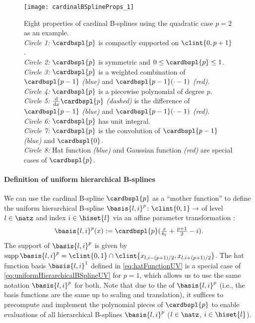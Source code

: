 \begin{figure}
  \texttt{[image: cardinalBSplineProps\_1]}%
  \caption{%
    Eight properties of cardinal B-splines using the quadratic case
    $p = 2$ as an example.\\
    \emph{Circle 1:} $\cardbspl{p}$ is compactly supported on $\clint{0, p+1}$.\\
    \emph{Circle 2:} $\cardbspl{p}$ is symmetric and $0 \le \cardbspl{p} \le 1$.\\
    \emph{Circle 3:} $\cardbspl{p}$ is a weighted combination of
    $\cardbspl{p-1}$ \emph{\textcolor{C0}{(blue)}} and
    $\cardbspl{p-1}({\cdot} - 1)$ \emph{\textcolor{C1}{(red)}}.\\
    \emph{Circle 4:} $\cardbspl{p}$ is a piecewise polynomial of degree $p$.\\
    \emph{Circle 5:} $\frac{\diff}{\dx} \cardbspl{p}$ \emph{(dashed)}
    is the difference of
    $\cardbspl{p-1}$ \emph{\textcolor{C0}{(blue)}} and
    $\cardbspl{p-1}({\cdot} - 1)$ \emph{\textcolor{C1}{(red)}}.\\
    \emph{Circle 6:} $\cardbspl{p}$ has unit integral.\\
    \emph{Circle 7:} $\cardbspl{p}$ is the convolution of
    $\cardbspl{p-1}$ \emph{\textcolor{C0}{(blue)}} and $\cardbspl{0}$.\\
    \emph{Circle 8:} Hat function \emph{\textcolor{C0}{(blue)}} and
    Gaussian function \emph{\textcolor{C1}{(red)}}
    are special cases of $\cardbspl{p}$.%
  }%
  \label{fig:cardinalBSplineProps}
\end{figure}

\paragraph{Definition of uniform hierarchical B-splines}

We can use the cardinal B-spline $\cardbspl{p}$ as a ``mother function'' to
define the uniform hierarchical B-spline
$\basis{l,i}^p\colon \clint{0, 1} \to \real$ of level~$l \in \natz$ and index
$i \in \hiset{l}$ via an affine parameter transformation
\cite{Pflueger10Spatially}:
\begin{equation}
  \label{eq:uniformHierarchicalBSplineUV}
  \basis{l,i}^p(x)
  := \cardbspl{p}(\tfrac{x}{\ms{l}} + \tfrac{p+1}{2} - i).
\end{equation}
The support of $\basis{l,i}^p$ is given
by $\supp \basis{l,i}^p = \clint{0, 1} \cap \clint{\gp{l,i-(p+1)/2}, \gp{l,i+(p+1)/2}}$.
The hat function basis $\basis{l,i}^1$ defined in
\eqref{eq:hatFunctionUV} is a special case of
\eqref{eq:uniformHierarchicalBSplineUV} for $p = 1$,
which allows us to use the same notation $\basis{l,i}^p$ for both.
Note that due to the  of $\basis{l,i}^p$
(i.e., the basis functions are the same up to scaling and translation),
it suffices to precompute and implement the polynomial pieces of $\cardbspl{p}$
to enable evaluations of all hierarchical B-splines
$\basis{l,i}^p$ ($l \in \natz$, $i \in \hiset{l}$).


